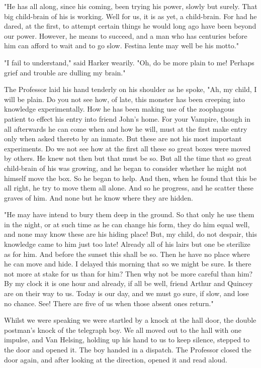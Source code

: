 "He has all along, since his coming, been trying his power, slowly but surely. That big child-brain of his is working. Well for us, it is as yet, a child-brain. For had he dared, at the first, to attempt certain things he would long ago have been beyond our power. However, he means to succeed, and a man who has centuries before him can afford to wait and to go slow. Festina lente may well be his motto." 

"I fail to understand," said Harker wearily. "Oh, do be more plain to me! Perhaps grief and trouble are dulling my brain." 

The Professor laid his hand tenderly on his shoulder as he spoke, "Ah, my child, I will be plain. Do you not see how, of late, this monster has been creeping into knowledge experimentally. How he has been making use of the zoophagous patient to effect his entry into friend John's home. For your Vampire, though in all afterwards he can come when and how he will, must at the first make entry only when asked thereto by an inmate. But these are not his most important experiments. Do we not see how at the first all these so great boxes were moved by others. He knew not then but that must be so. But all the time that so great child-brain of his was growing, and he began to consider whether he might not himself move the box. So he began to help. And then, when he found that this be all right, he try to move them all alone. And so he progress, and he scatter these graves of him. And none but he know where they are hidden. 

"He may have intend to bury them deep in the ground. So that only he use them in the night, or at such time as he can change his form, they do him equal well, and none may know these are his hiding place! But, my child, do not despair, this knowledge came to him just too late! Already all of his lairs but one be sterilize as for him. And before the sunset this shall be so. Then he have no place where he can move and hide. I delayed this morning that so we might be sure. Is there not more at stake for us than for him? Then why not be more careful than him? By my clock it is one hour and already, if all be well, friend Arthur and Quincey are on their way to us. Today is our day, and we must go sure, if slow, and lose no chance. See! There are five of us when those absent ones return." 

Whilst we were speaking we were startled by a knock at the hall door, the double postman's knock of the telegraph boy. We all moved out to the hall with one impulse, and Van Helsing, holding up his hand to us to keep silence, stepped to the door and opened it. The boy handed in a dispatch. The Professor closed the door again, and after looking at the direction, opened it and read aloud. 

